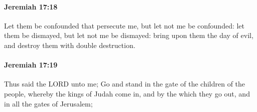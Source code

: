 		\paragraph{Jeremiah 17:18} %
			\label{JEREMIAH-17-18}

			Let them be confounded that persecute me, but let not me be confounded: let them be dismayed, but let not me be dismayed: bring upon them the day of evil, and destroy them with double destruction.


		\paragraph{Jeremiah 17:19} %
			\label{JEREMIAH-17-19}

			Thus said the LORD unto me; Go and stand in the gate of the children of the people, whereby the kings of Judah come in, and by the which they go out, and in all the gates of Jerusalem;


